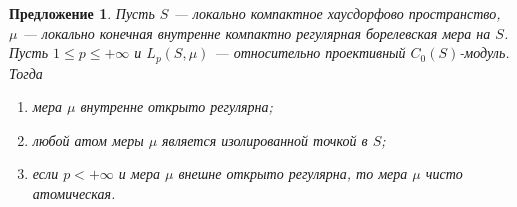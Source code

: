 \documentclass[12pt]{article}
\newtheorem{proposition}[theorem]{Предложение}
\begin{document}
\begin{proposition}\label{LpC0ModNecessCond}  Пусть $S$ --- локально компактное
    хаусдорфово пространство, $\mu$ --- локально конечная внутренне компактно
    регулярная борелевская мера на $S$. Пусть $1\leq p\leq +\infty$ и
    $L_p(S,\mu)$ --- относительно проективный $C_0(S)$-модуль. Тогда
    \begin{enumerate}[label = (\roman*)]
        \item мера $\mu$ внутренне открыто регулярна;

        \item любой атом меры $\mu$ является изолированной точкой в $S$;

        \item если $p<+\infty$ и мера $\mu$ внешне открыто регулярна, то мера
              $\mu$ чисто атомическая.
    \end{enumerate}
\end{proposition}
\end{document}
